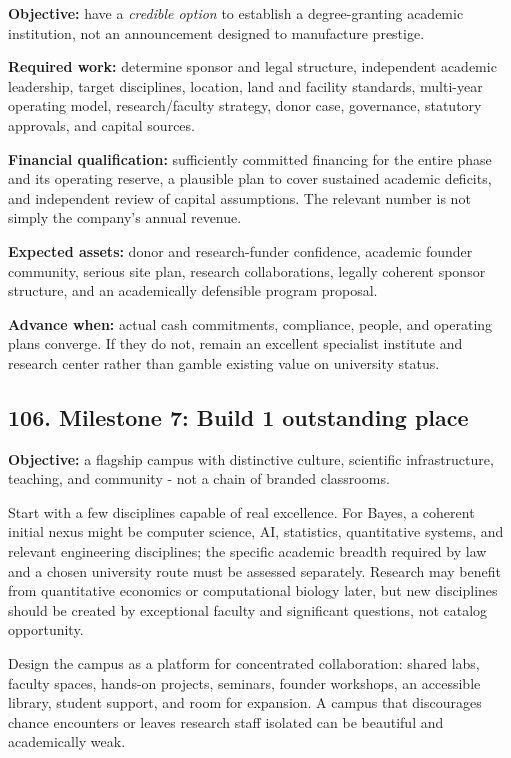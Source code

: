 \textbf{Objective:} have a \textit{credible option} to establish a degree-granting academic institution, not an announcement designed to manufacture prestige.

\textbf{Required work:} determine sponsor and legal structure, independent academic leadership, target disciplines, location, land and facility standards, multi-year operating model, research/\allowbreak faculty strategy, donor case, governance, statutory approvals, and capital sources.

\textbf{Financial qualification:} sufficiently committed financing for the entire phase and its operating reserve, a plausible plan to cover sustained academic deficits, and independent review of capital assumptions. The relevant number is not simply the company's annual revenue.

\textbf{Expected assets:} donor and research-funder confidence, academic founder community, serious site plan, research collaborations, legally coherent sponsor structure, and an academically defensible program proposal.

\textbf{Advance when:} actual cash commitments, compliance, people, and operating plans converge. If they do not, remain an excellent specialist institute and research center rather than gamble existing value on university status.

\subsection{106. Milestone 7: Build 1 outstanding place}

\textbf{Objective:} a flagship campus with distinctive culture, scientific infrastructure, teaching, and community - not a chain of branded classrooms.

Start with a few disciplines capable of real excellence. For Bayes, a coherent initial nexus might be computer science, AI, statistics, quantitative systems, and relevant engineering disciplines; the specific academic breadth required by law and a chosen university route must be assessed separately. Research may benefit from quantitative economics or computational biology later, but new disciplines should be created by exceptional faculty and significant questions, not catalog opportunity.

Design the campus as a platform for concentrated collaboration: shared labs, faculty spaces, hands-on projects, seminars, founder workshops, an accessible library, student support, and room for expansion. A campus that discourages chance encounters or leaves research staff isolated can be beautiful and academically weak.

